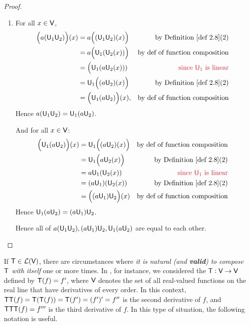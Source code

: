 \begin{proof}
\begin{enumerate}
\item For all \(x \in \textsf{V}\),
\begin{align*}
    \Big( a(\U_1 \U_2) \Big)(x) & = a\Big( (\U_1\U_2)(x) \Big) & \text{by \DEF{2.8}(2)} \\
                                & = a\Big( \U_1(\U_2(x)) \Big) & \text{by def of function composition} \\
                                & = \Big( \U_1(a\U_2(x)) ) & \text{\RED{since \(\U_1\) is linear}} \\
                                & = \U_1 \Big( (a\U_2)(x) \Big) & \text{by \DEF{2.8}(2)} \\
                                & = \Big( \U_1(a\U_2) \Big)(x), & \text{by def of function composition}
\end{align*}
Hence \(a(\textsf{U}_1\textsf{U}_2) = \textsf{U}_1(a\textsf{U}_2)\).

And for all \(x \in \textsf{V}\):
\begin{align*}
    \Big( \U_1(a\U_2) \Big)(x) & = \U_1 \Big( (a\U_2)(x) \Big) & \text{by def of function composition} \\
                               & = \U_1 \Big( a\U_2(x) \Big) & \text{by \DEF{2.8}(2)} \\
                               & = a\U_1(\U_2(x)) & \text{\RED{since \(\U_1\) is linear}} \\
                               & = (a\U_1)(\U_2(x)) & \text{by \DEF{2.8}(2)} \\
                               & = \Big( (a\U_1)\U_2 \Big)(x) & \text{by def of function composition}
\end{align*}
Hence \(\textsf{U}_1(a\textsf{U}_2) = (a\textsf{U}_1)\textsf{U}_2\).

Hence all of \(a(\textsf{U}_1\textsf{U}_2), (a\textsf{U}_1)\textsf{U}_2, \textsf{U}_1(a\textsf{U}_2)\) are equal to each other.
\end{enumerate}
\end{proof}

If \(\textsf{T} \in \mathcal{L}(\textsf{V})\), there are circumstances where \emph{it is natural (and \textbf{valid}) to compose \(\textsf{T}\) with itself} one or more times.
In , for instance, we considered the \LTRAN{} \(\textsf{T} : \textsf{V} \to \textsf{V}\) defined by \(\textsf{T}(f) = f'\),
where \(\textsf{V}\) denotes the set of all real-valued functions on the real line that have derivatives of every order.
In this context, \(\textsf{T}\textsf{T}(f) = \textsf{T}(\textsf{T}(f)) = \textsf{T}(f') = (f')' = f''\) is the second derivative of \(f\), and \(\textsf{T}\textsf{T}\textsf{T}(f) = f'''\) is the third derivative of \(f\).
In this type of situation, the following notation is useful.

